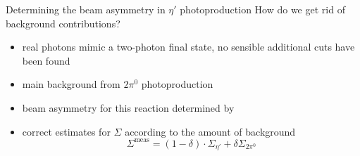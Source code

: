\documentclass[11pt,aspectratio=169,dvipsnames]{beamer}
\begin{document}
\begin{frame}{Determining the beam asymmetry in $\eta'$ photoproduction}
	How do we get rid of background contributions?
	\begin{itemize}
		\item real photons mimic a two-photon final state, no sensible additional cuts have been found
		\pause
		\item main background from $2\pi^0$ photoproduction
		\item beam asymmetry for this reaction determined by {\cites{mahlbergphd}}
		\item correct estimates for $\Sigma$ according to the amount of background
		$$\Sigma^\text{meas}=(1-\delta)\cdot\Sigma_{\eta'}+\delta\Sigma_{2\pi^0}$$
	\end{itemize}
\end{frame}
\end{document}
